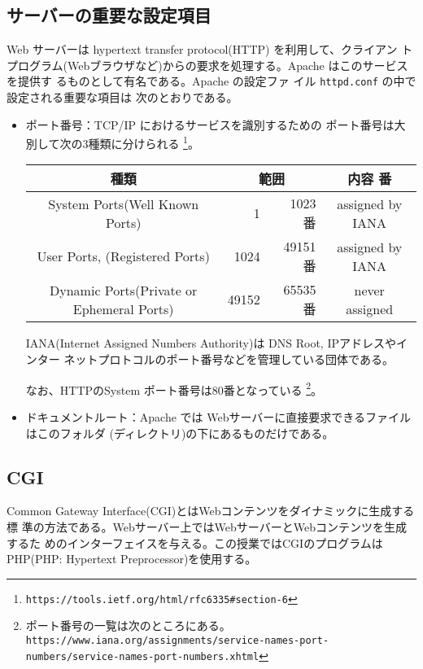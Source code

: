 \subsection{サーバーの重要な設定項目}
Web サーバーは hypertext transfer protocol(HTTP) を利用して、クライアン
トプログラム(Webブラウザなど)からの要求を処理する。Apache はこのサービスを提供す
るものとして有名である。Apache の設定ファ
イル \texttt{httpd.conf} の中で設定される重要な項目は
次のとおりである。
\begin{itemize}
 \item ポート番号：TCP/IP におけるサービスを識別するための
       ポート番号は大別して次の3種類に分けられる
\footnote{\texttt{https://tools.ietf.org/html/rfc6335\#section-6}}。
\begin{center}\vspace{-\baselineskip}
 \begin{tabular}{|c|r@{番$\sim$}r<{番}|c|}
\hline
種類 &\multicolumn{2}{c|}{範囲} &内容 \\\hline
  System Ports(Well Known Ports)& 1&1023 & assigned by IANA\\ \hline
  User Ports, (Registered Ports)& 1024&49151 & assigned by IANA\\
  \hline
  Dynamic Ports(Private or Ephemeral Ports)& 49152& 65535&never assigned \\ \hline
 \end{tabular}
\end{center}
IANA(Internet Assigned Numbers Authority)は DNS Root, IPアドレスやインター
       ネットプロトコルのポート番号などを管理している団体である。

       なお、HTTPのSystem ポート番号は80番となっている
\footnote{ポート番号の一覧は次のところにある。\\
%
 \texttt{https://www.iana.org/assignments/}\texttt{service-names-port-numbers/service-names-port-numbers.xhtml}}。


 \item ドキュメントルート：Apache では Webサーバーに直接要求できるファイルはこのフォルダ
       (ディレクトリ)の下にあるものだけである。
\end{itemize}
\subsection{CGI}
Common Gateway Interface(CGI)とはWebコンテンツをダイナミックに生成する標
準の方法である。Webサーバー上ではWebサーバーとWebコンテンツを生成するた
めのインターフェイスを与える。この授業ではCGIのプログラムはPHP(PHP:
Hypertext Preprocessor)を使用する。

